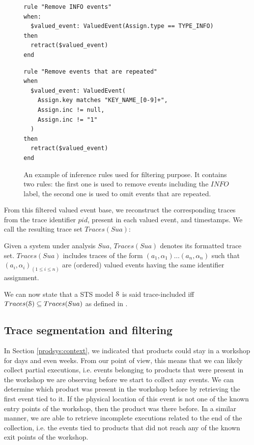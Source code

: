 \begin{figure}[ht]
\begin{framed}
\begin{BVerbatim}
rule "Remove INFO events"
when:
  $valued_event: ValuedEvent(Assign.type == TYPE_INFO)
then
  retract($valued_event)
end
\end{BVerbatim}
\end{framed}

\begin{framed}
\begin{BVerbatim}
rule "Remove events that are repeated"
when
  $valued_event: ValuedEvent(
    Assign.key matches "KEY_NAME_[0-9]+",
    Assign.inc != null,
    Assign.inc != "1"
  )
then
  retract($valued_event)
end
\end{BVerbatim}
\end{framed}

\caption{An example of inference rules used for filtering
purpose. It contains two rules: the first one is used to remove
events including the $INFO$ label, the second one is used to omit
events that are repeated.}
\label{fig:removalrules}
\end{figure}

From this filtered valued event base, we reconstruct the
corresponding traces from the trace identifier $pid$, present in
each valued event, and timestamps. We call the resulting trace
set $Traces(Sua)$:

\begin{definition}
    Given a system under analysis $\mathit{Sua}$, $Traces(Sua)$ denotes
    its formatted trace set. $Traces(Sua)$ includes traces of the
    form $(a_1,\alpha_1) \dots (a_n,\alpha_n)$ such that
    $(a_i,\alpha_i)_{(1 \leq i \leq n)}$ are (ordered) valued
    events having the same identifier assignment.

	\label{def:structuredtrace}
\end{definition}

We can now state that a STS model $\EuScript{S}$ is said
trace-included iff $Traces(\EuScript{S}) \subseteq Traces(Sua)$
as defined in \cite{petrenko06}.

\subsection{Trace segmentation and filtering}
\label{sec:modelinf:prodsystems:segmentation}

In Section \ref{prodsys:context}, we indicated that products
could stay in a workshop for days and even weeks. From our point
of view, this means that we can likely collect partial
executions, i.e. events belonging to products that were present
in the workshop we are observing before we start to collect any
events. We can determine which product was present in the
workshop before by retrieving the first event tied to it.
If the physical location of this event is not one of the known
entry points of the workshop, then the product was there before.
In a similar manner, we are able to retrieve incomplete
executions related to the end of the collection, i.e. the events
tied to products that did not reach any of the known exit points
of the workshop.

